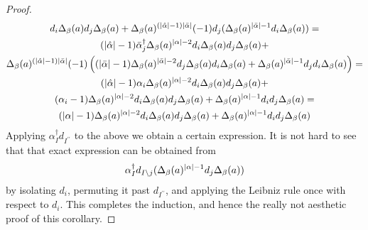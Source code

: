 \begin{cor}
\begin{proof}
\begin{gather*}
      d_i \Delta_\beta(a) d_j \Delta_\beta (a) %
      + %
      \Delta_\beta(a)^{(\abs{\hat\alpha}-1)\abs{\bar\alpha}} %
      (-1) d_j ( \Delta_\beta(a)^{\abs{\bar\alpha}-1} %
      d_i \Delta_\beta(a) ) = \\%
    (\abs{\hat\alpha}-1)\bar\alpha^\dagger_j%
      \Delta_\beta(a)^{\abs{\alpha} - 2} %
      d_i \Delta_\beta(a) d_j \Delta_\beta (a) %
      + \\%
      \Delta_\beta(a)^{(\abs{\hat\alpha}-1)\abs{\bar\alpha}} %
      (-1) \left( %
      (\abs{\bar\alpha}-1) %
      \Delta_\beta (a)^{\abs{\bar\alpha}-2} %
      d_j \Delta_\beta (a) d_i \Delta_\beta (a) %
      + %
      \Delta_\beta(a)^{\abs{\bar\alpha}-1} %
      d_j d_i \Delta_\beta(a)
      \right) = \\%
    (\abs{\hat\alpha}-1)\alpha_i%
      \Delta_\beta(a)^{\abs{\alpha} - 2} %
      d_i \Delta_\beta(a) d_j \Delta_\beta (a) %
      + \\%
      (\alpha_i-1) %
      \Delta_\beta(a)^{\abs{\alpha}-2} %
      d_i \Delta_\beta (a) d_j \Delta_\beta (a) %
      + %
      \Delta_\beta(a)^{\abs{\alpha}-1} %
      d_i d_j \Delta_\beta(a) = \\%
    (\abs{\alpha}-1)%
      \Delta_\beta(a)^{\abs{\alpha} - 2} %
      d_i \Delta_\beta(a) d_j \Delta_\beta (a) %
      + %
      \Delta_\beta(a)^{\abs{\alpha}-1} %
      d_i d_j \Delta_\beta(a)%
    \end{gather*}
  Applying $\alpha^\dagger_I d_{I^{\prime\prime}}$ to the above we obtain a certain expression. It is not hard to see that that exact expression can be obtained from
  \begin{equation*}
    \alpha^\dagger_I d_{I \setminus j} %
      ( \Delta_\beta(a)^{\abs{\alpha}-1} d_j \Delta_\beta (a) )
  \end{equation*}
  by isolating $d_i$, permuting it past $d_{I^{\prime\prime}}$, and applying the Leibniz rule once with respect to $d_i$. This completes the induction, and hence the really not aesthetic proof of this corollary.
  \end{proof}
  \end{cor}
